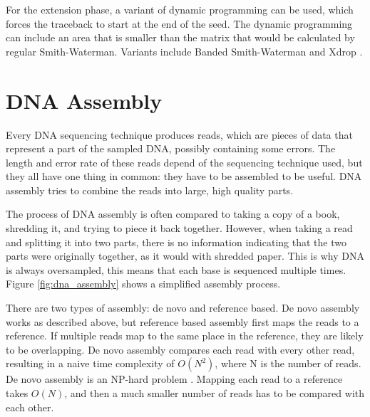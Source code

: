 \documentclass[../main/thesis.tex]{subfiles}
\begin{document}
For the extension phase, a variant of dynamic programming can be used, which forces the traceback to start at the end of the seed.
The dynamic programming can include an area that is smaller than the matrix that would be calculated by regular Smith-Waterman.
Variants include Banded Smith-Waterman \cite{banded_SW} and Xdrop \cite{Xdrop}.

\section{DNA Assembly}\label{sec:dna_assembly}
Every DNA sequencing technique produces reads, which are pieces of data that represent a part of the sampled DNA, possibly containing some errors.
The length and error rate of these reads depend of the sequencing technique used, but they all have one thing in common: they have to be assembled to be useful.
DNA assembly tries to combine the reads into large, high quality parts.

The process of DNA assembly is often compared to taking a copy of a book, shredding it, and trying to piece it back together.
However, when taking a read and splitting it into two parts, there is no information indicating that the two parts were originally together, as it would with shredded paper.
This is why DNA is always oversampled, this means that each base is sequenced multiple times.
Figure \ref{fig:dna_assembly} shows a simplified assembly process.


There are two types of assembly: de novo and reference based.
De novo assembly works as described above, but reference based assembly first maps the reads to a reference.
If multiple reads map to the same place in the reference, they are likely to be overlapping.
De novo assembly compares each read with every other read, resulting in a naive time complexity of $O(N^2)$, where N is the number of reads.
De novo assembly is an NP-hard problem \cite{denovo_NP}.
Mapping each read to a reference takes $O(N)$, and then a much smaller number of reads has to be compared with each other.
\end{document}
